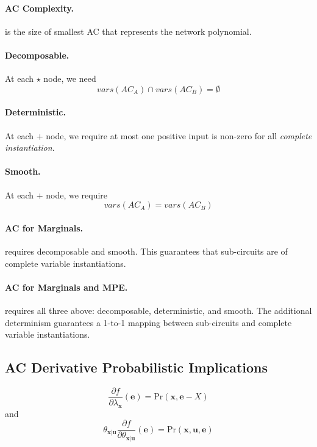 \documentclass[11pt]{article}
\newcommand{\be}{\mathbf{e}}
\newcommand{\bu}{\mathbf{u}}
\newcommand{\bx}{\mathbf{x}}
\newcommand{\pr}{\mathrm{Pr}}
\begin{document}
\paragraph{AC Complexity.}
is the size of smallest AC that represents the network polynomial. 

\paragraph{Decomposable.}
At each $\star$ node, we need 
\begin{equation}
	vars(AC_A) \cap vars(AC_B) = \emptyset
\end{equation}

\paragraph{Deterministic.}
At each $+$ node, we require at most one positive input is non-zero for all \textit{complete instantiation}. 

\paragraph{Smooth.}
At each $+$ node, we require 
\begin{equation}
	vars(AC_A) = vars(AC_B)
\end{equation}

\paragraph{AC for Marginals.} requires decomposable and smooth. This guarantees that sub-circuits are of complete variable instantiations. 

\paragraph{AC for Marginals and MPE.} requires all three above: decomposable, deterministic, and smooth. The additional determinism guarantees a 1-to-1 mapping between sub-circuits and complete variable instantiations. 

\subsection{AC Derivative Probabilistic Implications}
\begin{equation}
	\frac{\partial f}{\partial \lambda _\bx} (\be) = \pr( \bx, \be - X) 
\end{equation}
and 
\begin{equation}
	\theta_{\bx | \bu} \frac{\partial f}{\partial \theta_{\bx | \bu}} ( \be) = \pr (\bx, \bu, \be)
\end{equation}
\end{document}
